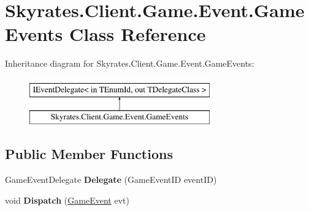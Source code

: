 \hypertarget{class_skyrates_1_1_client_1_1_game_1_1_event_1_1_game_events}{\section{Skyrates.\-Client.\-Game.\-Event.\-Game\-Events Class Reference}
\label{class_skyrates_1_1_client_1_1_game_1_1_event_1_1_game_events}
}
Inheritance diagram for Skyrates.\-Client.\-Game.\-Event.\-Game\-Events\-:\begin{figure}[H]
\begin{center}
\leavevmode
\includegraphics[height=2.000000cm]{class_skyrates_1_1_client_1_1_game_1_1_event_1_1_game_events}
\end{center}
\end{figure}
\subsection*{Public Member Functions}
\begin{DoxyCompactItemize}
\item 
\hypertarget{class_skyrates_1_1_client_1_1_game_1_1_event_1_1_game_events_aef35aef1725ea32473c81becae252e1e}{Game\-Event\-Delegate {\bfseries Delegate} (Game\-Event\-I\-D event\-I\-D)}\label{class_skyrates_1_1_client_1_1_game_1_1_event_1_1_game_events_aef35aef1725ea32473c81becae252e1e}

\item 
\hypertarget{class_skyrates_1_1_client_1_1_game_1_1_event_1_1_game_events_a039cc913141b24e8684f16d94b545b01}{void {\bfseries Dispatch} (\hyperlink{class_skyrates_1_1_client_1_1_game_1_1_event_1_1_game_event}{Game\-Event} evt)}\label{class_skyrates_1_1_client_1_1_game_1_1_event_1_1_game_events_a039cc913141b24e8684f16d94b545b01}

\end{DoxyCompactItemize}
